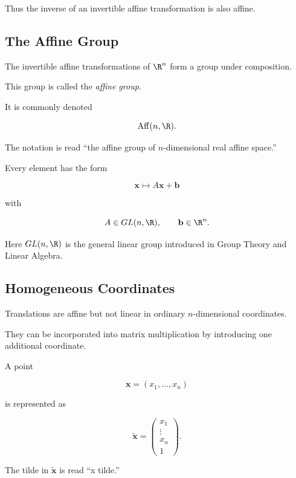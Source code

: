 Thus the inverse of an invertible affine transformation is also affine.

\subsection{The Affine Group}
\label{subsec:affine-group}

The invertible affine transformations of \(\R^n\) form a group under
composition.

This group is called the \emph{affine group}.

It is commonly denoted

\[ \operatorname{Aff}(n,\R). \]

The notation is read ``the affine group of \(n\)-dimensional real affine
space.''

Every element has the form

\[ \mathbf{x}\mapsto A\mathbf{x}+\mathbf{b} \]

with

\[ A\in GL(n,\R),\qquad \mathbf{b}\in\R^n. \]

Here \(GL(n,\R)\) is the general linear group introduced in Group Theory and
Linear Algebra.

\subsection{Homogeneous Coordinates}
\label{subsec:affine-homogeneous-coordinates}

Translations are affine but not linear in ordinary \(n\)-dimensional
coordinates.

They can be incorporated into matrix multiplication by introducing one
additional coordinate.

A point

\[ \mathbf{x}=(x_1,\ldots,x_n) \]

is represented as

\[
\boxed{
\widetilde{\mathbf{x}}
=
\begin{pmatrix}
x_1\\
\vdots\\
x_n\\
1
\end{pmatrix}.
}
\]

The tilde in \(\widetilde{\mathbf{x}}\) is read ``x tilde.''


